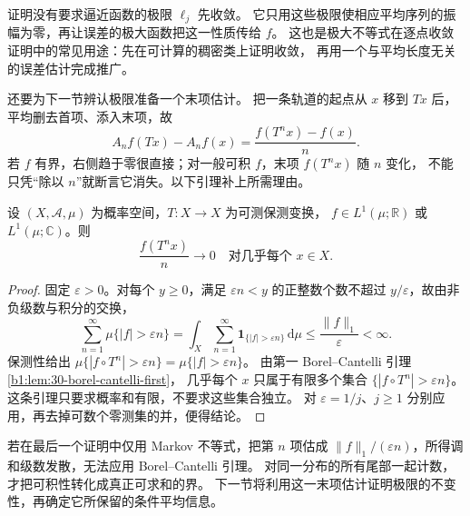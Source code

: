 证明没有要求逼近函数的极限 \(\ell_j\) 先收敛。
它只用这些极限使相应平均序列的振幅为零，再让误差的极大函数把这一性质传给 \(f\)。
这也是极大不等式在逐点收敛证明中的常见用途：先在可计算的稠密类上证明收敛，
再用一个与平均长度无关的误差估计完成推广。

\ProseParagraphBreak

还要为下一节辨认极限准备一个末项估计。
把一条轨道的起点从 \(x\) 移到 \(Tx\) 后，平均删去首项、添入末项，故
\[
 A_nf(Tx)-A_nf(x)=\frac{f(T^nx)-f(x)}n.
\]
若 \(f\) 有界，右侧趋于零很直接；对一般可积 \(f\)，末项 \(f(T^nx)\) 随 \(n\) 变化，
不能只凭“除以 \(n\)”就断言它消失。以下引理补上所需理由。

\begin{lemma}[可积观测的末项估计]
\label{b1:lem:orbit-tail-32}
设 \((X,\mathcal A,\mu)\) 为概率空间，\(T:X\to X\) 为可测保测变换，
\(f\in L^1(\mu;\mathbb R)\) 或 \(L^1(\mu;\mathbb C)\)。则
\[
 \frac{f(T^nx)}n\longrightarrow0
 \quad\text{对几乎每个 }x\in X.
\]
\end{lemma}
\begin{proof}
固定 \(\varepsilon>0\)。对每个 \(y\geq0\)，满足 \(\varepsilon n<y\) 的正整数个数不超过
\(y/\varepsilon\)，故由非负级数与积分的交换，
\[
 \sum_{n=1}^{\infty}\mu\{|f|>\varepsilon n\}
 =\int_X\sum_{n=1}^{\infty}
        \mathbf1_{\{|f|>\varepsilon n\}}\,\mathrm d\mu
 \leq\frac{\|f\|_1}{\varepsilon}<\infty.
\]
保测性给出
\(\mu\{|f\circ T^n|>\varepsilon n\}=\mu\{|f|>\varepsilon n\}\)。
由第一 Borel--Cantelli 引理\cref{b1:lem:30-borel-cantelli-first}，
几乎每个 \(x\) 只属于有限多个集合 \(\{|f\circ T^n|>\varepsilon n\}\)。
这条引理只要求概率和有限，不要求这些集合独立。
对 \(\varepsilon=1/j\)、\(j\geq1\) 分别应用，再去掉可数个零测集的并，便得结论。
\end{proof}

若在最后一个证明中仅用 Markov 不等式，把第 \(n\) 项估成
\(\|f\|_1/(\varepsilon n)\)，所得调和级数发散，无法应用 Borel--Cantelli 引理。
对同一分布的所有尾部一起计数，才把可积性转化成真正可求和的界。
下一节将利用这一末项估计证明极限的不变性，再确定它所保留的条件平均信息。

